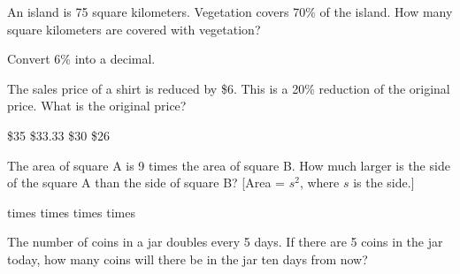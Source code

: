 \documentclass[10pt,answers]{exam}
\begin{document}
\begin{questions}
\question 
An island is 75 square kilometers. Vegetation covers 70\% of the island. How many square kilometers are covered with vegetation?
\begin{oneparchoices}
\end{oneparchoices}

\question Convert 6\% into a decimal.
\begin{oneparchoices}
\end{oneparchoices}






\question 
The sales price of a shirt is reduced by \$6. This is a 20\% reduction of the original price. What is the original price?
\begin{oneparchoices}
\choice \$35
\choice \$33.33
\CorrectChoice \$30
\choice \$26
\end{oneparchoices}

\question
The area of  square A is 9 times the area of square B. How much larger is the side of the square A than the side of square B? [Area  = $\displaystyle s^2$, where $s$ is the side.]

\begin{oneparchoices}
 times
 times 
 times
 times
\end{oneparchoices}

\question The number of coins in a jar doubles every 5 days. If there are 5 coins in the jar today, how many coins will there be in the jar ten days from now?

\begin{oneparchoices}
\end{oneparchoices}



\end{questions}
\end{document}
